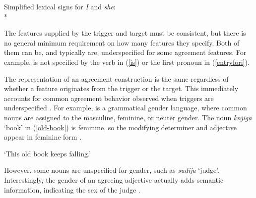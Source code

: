 \documentclass[output=paper,biblatex,babelshorthands,newtxmath,draftmode,colorlinks,citecolor=brown]{langscibook}
\begin{document}
\ea
\label{entryfori}
Simplified lexical signs for  \textit{I} and \textit{she}: \\*
\hspace{1cm}
\z

\eal
\label{sober}
\zl
 
\noindent
The features supplied by the trigger and target must be consistent, but 
there is no general minimum requirement on how many features they specify.  Both of them can be, and typically are, underspecified for some agreement features.  For example,  is not specified by the verb in (\ref{is}) or the first pronoun in (\ref{entryfori}).   

\largerpage[2]
The representation of an agreement construction is the same regardless of whether a feature
originates from the trigger or the target. This immediately accounts for common agreement behavior observed when triggers are underspecified
\citep{Barlow:1988}. For example,  is a grammatical gender language, where
common nouns are assigned to the  masculine, feminine, or neuter gender. The noun \textit{knjiga}
`book’ in (\ref{old-book}) is feminine, so the modifying determiner and adjective appear in feminine
form \citep[4]{Wechsler+Zlatic:2003}. 

\begin{exe}
\ex \label{old-book}
\glt `This old book keeps falling.' 
\end{exe} 


\noindent
However, some nouns are unspecified for gender, such as \textit{sudija}  `judge’.  Interestingly, the gender of an agreeing adjective actually adds semantic information, indicating the sex of the judge \citep[42, example\,(23)]{Wechsler+Zlatic:2003}.
\end{document}
